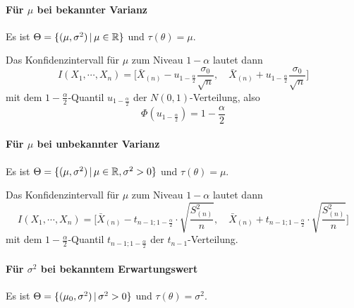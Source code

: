             \paragraph{Für \(\mu\) bei bekannter Varianz}
                Es ist \( \Theta = \{ (\mu, \sigma^2) \,\vert\, \mu \in \mathbb{R} \} \) und \( \tau(\theta) = \mu \).
                
                Das Konfidenzintervall für \(\mu\) zum Niveau \( 1 - \alpha \) lautet dann
                \begin{equation*}
	                I(X_1, \cdots, X_n) = \Bigg[ \bar{X}_{(n)} - u_{1 - \frac{\alpha}{2}} \frac{\sigma_0}{\sqrt{n}}, \quad \bar{X}_{(n)} + u_{1 - \frac{\alpha}{2}} \frac{\sigma_0}{\sqrt{n}} \Bigg]
                \end{equation*}
                mit dem \( 1 - \frac{\alpha}{2} \)-Quantil \( u_{ 1 - \frac{\alpha}{2} } \) der \( N(0, 1) \)-Verteilung, also
                \begin{equation*}
	                \Phi(u_{ 1 - \frac{\alpha}{2} }) = 1 - \frac{\alpha}{2}
                \end{equation*}

            \paragraph{Für \(\mu\) bei unbekannter Varianz}
                Es ist \( \Theta = \{ (\mu, \sigma^2) \,\vert\, \mu \in \mathbb{R}, \sigma^2 > 0 \} \) und \( \tau(\theta) = \mu \).
                
                Das Konfidenzintervall für \(\mu\) zum Niveau \( 1 - \alpha \) lautet dann
                \begin{equation*}
	                I(X_1, \cdots, X_n) = \Bigg[ \bar{X}_{(n)} - t_{ n - 1; 1 - \frac{\alpha}{2} } \cdot \sqrt{\frac{S_{(n)}^2}{n}}, \quad \bar{X}_{(n)} + t_{ n - 1; 1 - \frac{\alpha}{2} } \cdot \sqrt{\frac{S_{(n)}^2}{n}} \Bigg]
                \end{equation*}
                mit dem \( 1 - \frac{\alpha}{2} \)-Quantil \( t_{ n - 1; 1 - \frac{\alpha}{2} } \) der \( t_{n-1} \)-Verteilung.

            \paragraph{Für \(\sigma^2\) bei bekanntem Erwartungswert}
                Es ist \( \Theta = \{ (\mu_0, \sigma^2) \,\vert\, \sigma^2 > 0 \} \) und \( \tau(\theta) = \sigma^2 \).
                
